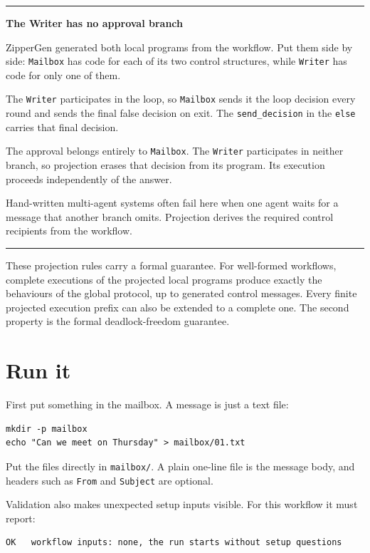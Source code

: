 \documentclass[11pt,a4paper]{article}
\newenvironment{notebox}[1]
{\begin{center}\begin{minipage}{0.94\linewidth}
 \color{ZipperInk}\hrule\vspace{5pt}\textbf{#1}\par\smallskip}
{\vspace{5pt}\hrule\end{minipage}\end{center}}
\begin{document}
\begin{notebox}{The Writer has no approval branch}
ZipperGen generated both local programs from the workflow. Put them side by
side: \texttt{Mailbox} has code for each of its two control structures, while
\texttt{Writer} has code for only one of them.

The \texttt{Writer} participates in the loop, so \texttt{Mailbox} sends it the
loop decision every round and sends the final false decision on exit. The
\texttt{send\_decision} in the \texttt{else} carries that final decision.

The approval belongs entirely to \texttt{Mailbox}. The \texttt{Writer}
participates in neither branch, so projection erases that decision from its
program. Its execution proceeds independently of the answer.

Hand-written multi-agent systems often fail here when one agent waits for a
message that another branch omits. Projection derives the required control
recipients from the workflow.
\end{notebox}

These projection rules carry a formal guarantee. For well-formed workflows,
complete executions of the projected local programs produce exactly the
behaviours of the global protocol, up to generated control messages. Every
finite projected execution prefix can also be extended to a complete one. The
second property is the formal deadlock-freedom guarantee.

\section{Run it}

First put something in the mailbox. A message is just a text file:

\begin{lstlisting}[style=shell]
mkdir -p mailbox
echo "Can we meet on Thursday" > mailbox/01.txt
\end{lstlisting}

Put the files directly in \texttt{mailbox/}. A plain one-line file is the
message body, and headers such as \texttt{From} and \texttt{Subject} are
optional.

Validation also makes unexpected setup inputs visible. For this workflow it
must report:

\begin{lstlisting}
OK   workflow inputs: none, the run starts without setup questions
\end{lstlisting}
\end{document}
